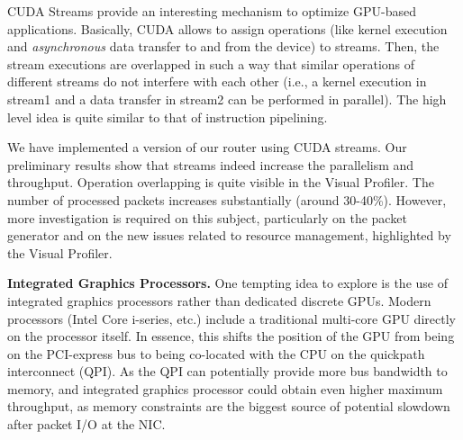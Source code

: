 CUDA Streams provide an interesting mechanism to optimize GPU-based
applications. Basically, CUDA allows to assign operations (like kernel
execution and \emph{asynchronous} data transfer to and from the device) to
streams. Then, the stream executions are overlapped in such a way that similar
operations of different streams do not interfere with each other (i.e., a kernel
execution in stream1 and a data transfer in stream2 can be performed in
parallel). The high level idea is quite similar to that of instruction
pipelining.

We have implemented a version of our router using CUDA streams. Our preliminary
results show that streams indeed increase the parallelism and throughput.
Operation overlapping is quite visible in the Visual Profiler. The number of
processed packets increases substantially (around 30-40\%). However, more
investigation is required on this subject, particularly on the packet generator
and on the new issues related to resource management, highlighted by the Visual
Profiler.


\medskip \noindent \textbf{Integrated Graphics Processors.} One tempting idea
to explore is the use of integrated graphics processors rather than dedicated
discrete GPUs. Modern processors (Intel Core i-series, etc.) include a
traditional multi-core GPU directly on the processor itself. In essence, this
shifts the position of the GPU from being on the PCI-express bus to being
co-located with the CPU on the quickpath interconnect (QPI). As the QPI can
potentially provide more bus bandwidth to memory, and integrated graphics
processor could obtain even higher maximum throughput, as memory constraints
are the biggest source of potential slowdown after packet I/O at the NIC.
